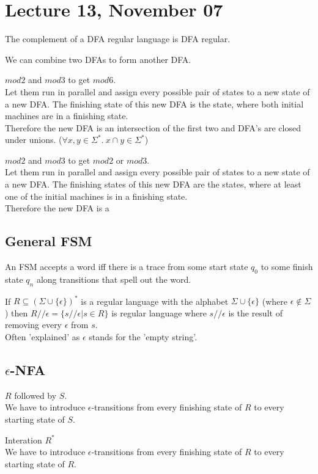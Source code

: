 \documentclass{article}
\begin{document}
\section{Lecture 13, November 07}
\begin{theorem}
The complement of a DFA regular language is DFA regular.
\end{theorem}
We can combine two DFAs to form another DFA.
\begin{example}
$mod 2$ and $mod 3$ to get $mod 6$.\\
Let them run in parallel and assign every possible pair of states to a new state of a new DFA. The finishing state of this new DFA is the state, where both initial machines are in a finishing state.\\ 
Therefore the new DFA is an intersection of the first two and DFA's are closed under unions. ($\forall x, y \in \Sigma^{*}.\: x \cap y \in \Sigma^{*}$)
\end{example}
\begin{example}
$mod 2$ and $mod 3$ to get $mod 2$ or $mod 3$.\\
Let them run in parallel and assign every possible pair of states to a new state of a new DFA.
The finishing states of this new DFA are the states, where at least one of the initial machines is in a finishing state.\\ 
Therefore the new DFA is a 
\end{example}
\subsection{General FSM}
An FSM accepts a word iff there is a trace from some start state $q_0$ to some finish state $q_n$ along transitions that spell out the word.
\begin{definition}
    If $R\subseteq (\Sigma \cup \{\epsilon\})^*$ is a regular language with the alphabet $\Sigma \cup \{\epsilon\}$ (where $\epsilon \not\in \Sigma$) then $R // \epsilon = \{s//\epsilon | s\in R\}$ is regular language where $s//\epsilon$ is the result of removing every $\epsilon$ from $s$.\\
    Often 'explained' as $\epsilon$ stands for the 'empty string'.
\end{definition}
\subsection{$\epsilon$-NFA}
\begin{example}
    $R$ followed by $S$.\\ 
    We have to introduce $\epsilon$-transitions from every finishing state of $R$ to every starting state of $S$.
\end{example}
\begin{example}
    Interation $R^*$\\ 
    We have to introduce $\epsilon$-transitions from every finishing state of $R$ to every starting state of $R$.
\end{example}
\end{document}
